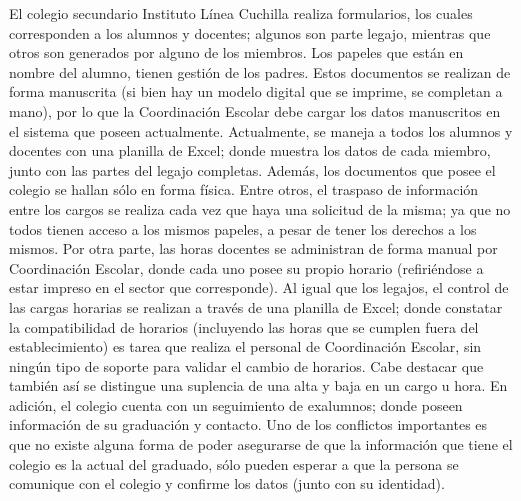 \normalsize{ \indent
El colegio secundario Instituto Línea Cuchilla realiza
formularios, los cuales corresponden a los alumnos y
docentes; algunos son parte legajo, mientras que otros
son generados por alguno de los miembros. Los papeles que
están en nombre del alumno, tienen gestión de los padres.
Estos documentos se realizan de forma manuscrita (si bien
hay un modelo digital que se imprime, se completan a mano),
por lo que la Coordinación Escolar debe cargar los datos
manuscritos en el sistema que poseen actualmente.
}
\newline
\normalsize{ \indent
Actualmente, se maneja a todos los alumnos y docentes con
una planilla de Excel; donde muestra los datos de cada
miembro, junto con las partes del legajo completas. Además,
los documentos que posee el colegio se hallan sólo en forma
física. Entre otros, el traspaso de información entre los
cargos se realiza cada vez que haya una solicitud de la
misma; ya que no todos tienen acceso a los mismos papeles,
a pesar de tener los derechos a los mismos.
}
\newline
\normalsize{ \indent
Por otra parte, las horas docentes se administran de forma
manual por Coordinación Escolar, donde cada uno posee su
propio horario (refiriéndose a estar impreso en el sector
que corresponde). Al igual que los legajos, el control de
las cargas horarias se realizan a través de una planilla de
Excel; donde constatar la compatibilidad de horarios
(incluyendo las horas que se cumplen fuera del
establecimiento) es tarea que realiza el personal de
Coordinación Escolar, sin ningún tipo de soporte para
validar el cambio de horarios. Cabe destacar que también
así se distingue una suplencia de una alta y baja en un
cargo u hora.
}
\newline
\normalsize{ \indent
En adición, el colegio cuenta con un seguimiento de exalumnos;
donde poseen información de su graduación y contacto. Uno de
los conflictos importantes es que no existe alguna forma de
poder asegurarse de que la información que tiene el colegio es
la actual del graduado, sólo pueden esperar a que la persona se
comunique con el colegio y confirme los datos (junto con su
identidad).
}
